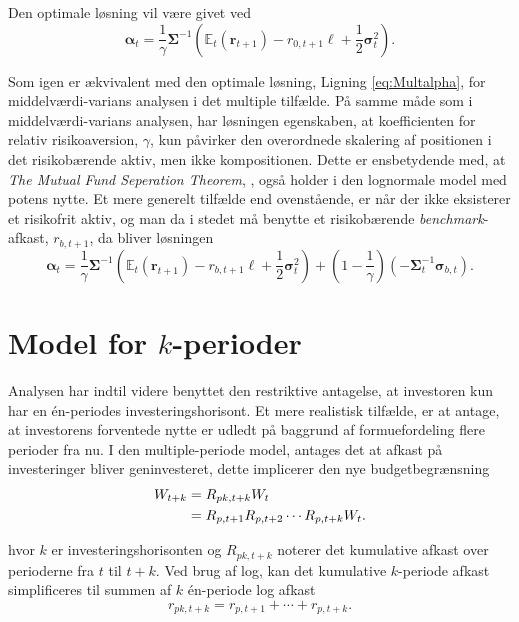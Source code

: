\documentclass[
  a4paper,
  oneside]{memoir}
\begin{document}
Den optimale løsning vil være givet ved
\begin{equation}
\bm{\alpha}_t=\frac{1}{\gamma}\bm{\Sigma}^{-1}\left(\mathbb{E}_t(\bm{r}_{t+1})-r_{0,t+1}\bm{\ell}+\frac{1}{2}\bm{\sigma}_t^2\right).\label{eq:Potmultalpha}
\end{equation}

Som igen er ækvivalent med den optimale løsning, Ligning \eqref{eq:Multalpha}, for middelværdi-varians analysen i det multiple tilfælde. På samme måde som i middelværdi-varians analysen, har løsningen egenskaben, at koefficienten for relativ risikoaversion, \(\gamma\), kun påvirker den overordnede skalering af positionen i det risikobærende aktiv, men ikke kompositionen. Dette er ensbetydende med, at \textit{The Mutual Fund Seperation Theorem}, \citep{Tobin1958}, også holder i den lognormale model med potens nytte. Et mere generelt tilfælde end ovenstående, er når der ikke eksisterer et risikofrit aktiv, og man da i stedet må benytte et risikobærende \emph{benchmark}-afkast, \(r_{b,t+1}\), da bliver løsningen
\begin{equation}
\bm{\alpha}_t=\frac{1}{\gamma}\bm{\Sigma}^{-1}\left(\mathbb{E}_t(\bm{r}_{t+1})-r_{b,t+1}\bm{\ell}+\frac{1}{2}\bm{\sigma}_t^2\right)+(1-\frac{1}{\gamma})(-\bm{\Sigma}_t^{-1}\bm{\sigma}_{b,t}).
\end{equation}

\hypertarget{model-for-k-perioder}{%
\section{\texorpdfstring{Model for \(k\)-perioder}{Model for k-perioder}}\label{model-for-k-perioder}}

Analysen har indtil videre benyttet den restriktive antagelse, at investoren kun har en én-periodes investeringshorisont. Et mere realistisk tilfælde, er at antage, at investorens forventede nytte er udledt på baggrund af formuefordeling flere perioder fra nu. I den multiple-periode model, antages det at afkast på investeringer bliver geninvesteret, dette implicerer den nye budgetbegrænsning
\begin{align}
W_{t+k}&=R_{pk,t+k}W_t \notag\\
&=R_{p,t+1}R_{p,t+2}\cdots R_{p,t+k}W_t.
\end{align}

hvor \(k\) er investeringshorisonten og \(R_{pk,t+k}\) noterer det kumulative afkast over perioderne fra \(t\) til \(t+k\). Ved brug af log, kan det kumulative \(k\)-periode afkast simplificeres til summen af \(k\) én-periode log afkast
\begin{equation}
r_{pk,t+k}=r_{p,t+1}+\cdots+r_{p,t+k}. \label{eq:sumportk}
\end{equation}
\end{document}
